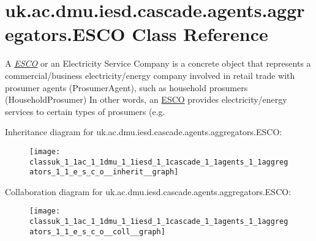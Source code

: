 \hypertarget{classuk_1_1ac_1_1dmu_1_1iesd_1_1cascade_1_1agents_1_1aggregators_1_1_e_s_c_o}{\section{uk.\-ac.\-dmu.\-iesd.\-cascade.\-agents.\-aggregators.\-E\-S\-C\-O Class Reference}
\label{classuk_1_1ac_1_1dmu_1_1iesd_1_1cascade_1_1agents_1_1aggregators_1_1_e_s_c_o}
}


A {\itshape \hyperlink{classuk_1_1ac_1_1dmu_1_1iesd_1_1cascade_1_1agents_1_1aggregators_1_1_e_s_c_o}{E\-S\-C\-O}} or an Electricity Service Company is a concrete object that represents a commercial/business electricity/energy company involved in retail trade with prosumer agents ({\ttfamily Prosumer\-Agent}), such as household prosumers ({\ttfamily Household\-Prosumer}) In other words, an {\ttfamily \hyperlink{classuk_1_1ac_1_1dmu_1_1iesd_1_1cascade_1_1agents_1_1aggregators_1_1_e_s_c_o}{E\-S\-C\-O}} provides electricity/energy services to certain types of prosumers (e.\-g.  




Inheritance diagram for uk.\-ac.\-dmu.\-iesd.\-cascade.\-agents.\-aggregators.\-E\-S\-C\-O\-:\nopagebreak
\begin{figure}[H]
\begin{center}
\leavevmode
\texttt{[image: classuk\_1\_1ac\_1\_1dmu\_1\_1iesd\_1\_1cascade\_1\_1agents\_1\_1aggregators\_1\_1\_e\_s\_c\_o\_\_inherit\_\_graph]}
\end{center}
\end{figure}


Collaboration diagram for uk.\-ac.\-dmu.\-iesd.\-cascade.\-agents.\-aggregators.\-E\-S\-C\-O\-:\nopagebreak
\begin{figure}[H]
\begin{center}
\leavevmode
\texttt{[image: classuk\_1\_1ac\_1\_1dmu\_1\_1iesd\_1\_1cascade\_1\_1agents\_1\_1aggregators\_1\_1\_e\_s\_c\_o\_\_coll\_\_graph]}
\end{center}
\end{figure}
